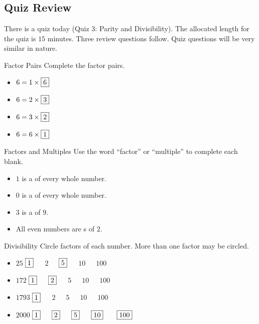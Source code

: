 \documentclass[a4paper,10pt]{report}
\begin{document}
\subsection{Quiz Review}

There is a quiz today (Quiz 3: Parity and Divisibility). The allocated length
for the quiz is $15$ minutes. Three review questions follow. Quiz questions will
be very similar in nature.

\begin{problem}{Factor Pairs}
 Complete the factor pairs.

 \begin{itemize}
  \item $6 = 1 \times \Ans{6}$
  \item $6 = 2 \times \Ans{3}$
  \item $6 = 3 \times \Ans{2}$
  \item $6 = 6 \times \Ans{1}$
 \end{itemize}
\end{problem}

\begin{problem}{Factors and Multiples}
 Use the word ``factor'' or ``multiple'' to complete each blank.

 \begin{itemize}
  \item $1$ is a  of every whole number.
  \item $0$ is a  of every whole number.
  \item $3$ is a  of $9$.
  \item All even numbers are s of $2$.
 \end{itemize}
\end{problem}

\begin{problem}{Divisibility}
 Circle factors of each number. More than one factor may be circled.

 \begin{itemize}
  \item $25$ \hfill $\Ans{1}$~~~$2$~~~$\Ans{5}$~~~$10$~~~$100$
  \item $172$ \hfill $\Ans{1}$~~~$\Ans{2}$~~~$5$~~~$10$~~~$100$
  \item $1793$ \hfill $\Ans{1}$~~~$2$~~~$5$~~~$10$~~~$100$
  \item $2000$ \hfill $\Ans{1}$~~~$\Ans{2}$~~~$\Ans{5}$~~~$\Ans{10}$
  ~~~$\Ans{100}$
 \end{itemize}
\end{problem}
\end{document}
